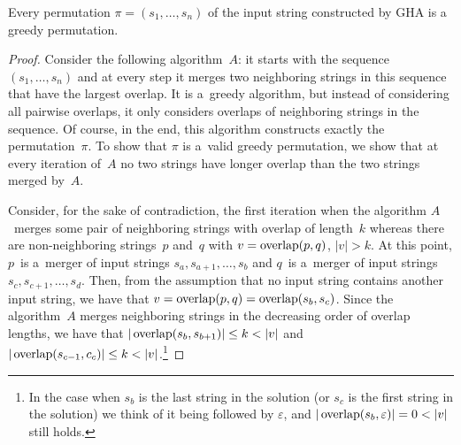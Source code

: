 \begin{theorem}
\label{thm:gr_im_wghc}
Every permutation $\pi=(s_1, \dots, s_n)$ of the input string constructed by GHA is a greedy permutation.
\end{theorem}
\begin{proof}
Consider the following algorithm~$A$: it starts with the sequence $(s_1, \dots, s_n)$ and at every step it merges two neighboring strings in this sequence that have the largest overlap. It is a~greedy algorithm, but instead of considering all pairwise overlaps, it only considers overlaps of neighboring strings in the sequence. Of course, in the end, this algorithm constructs exactly the permutation~$\pi$. To show that $\pi$ is a~valid greedy permutation, we show that at every iteration of~$A$ no two strings have longer overlap than the two strings merged by~$A$.

Consider, for the sake of contradiction, the first iteration when the algorithm $A$~merges some pair of neighboring strings with overlap of length~$k$ whereas there are non-neighboring strings~$p$ and~$q$ with $v=\operatorname{overlap}(p,q)$, $|v|>k$. 
At this point, $p$~is a~merger of input strings $s_a, s_{a+1}, \dotsc, s_b$
and $q$~is a~merger of input strings $s_c, s_{c+1}, \dotsc, s_d$. 
Then, from the assumption that no input string contains another input string, we have that $v=\operatorname{overlap}(p,q)=\operatorname{overlap}(s_b,s_c)$. Since the algorithm~$A$
merges neighboring strings in the decreasing order of overlap lengths, we have that $|\overlap(s_b,s_{b+1})| \le k <|v|$ and $|\operatorname{overlap}(s_{c-1},c_c)| \le k < |v|$.\footnote{In the case when $s_b$ is the last string in the solution (or $s_c$ is the first string in the solution) we think of it being followed by $\varepsilon$, and $|\overlap(s_b,\varepsilon)|=0<|v|$ still holds.} 


\end{proof}
